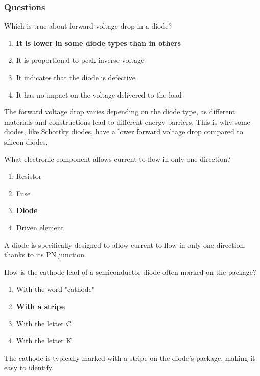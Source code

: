 \subsubsection*{Questions}

\begin{tcolorbox}[colback=gray!10!white,colframe=black!75!black,title={T6B01}]
    Which is true about forward voltage drop in a diode?
    \begin{enumerate}[label=\Alph*),noitemsep]
        \item \textbf{It is lower in some diode types than in others}
        \item It is proportional to peak inverse voltage
        \item It indicates that the diode is defective
        \item It has no impact on the voltage delivered to the load
    \end{enumerate}
\end{tcolorbox}
The forward voltage drop varies depending on the diode type, as different materials and constructions lead to different energy barriers. This is why some diodes, like Schottky diodes, have a lower forward voltage drop compared to silicon diodes.

\begin{tcolorbox}[colback=gray!10!white,colframe=black!75!black,title={T6B02}]
    What electronic component allows current to flow in only one direction?
    \begin{enumerate}[label=\Alph*),noitemsep]
        \item Resistor
        \item Fuse
        \item \textbf{Diode}
        \item Driven element
    \end{enumerate}
\end{tcolorbox}
A diode is specifically designed to allow current to flow in only one direction, thanks to its PN junction.

\begin{tcolorbox}[colback=gray!10!white,colframe=black!75!black,title={T6B06}]
    How is the cathode lead of a semiconductor diode often marked on the package?
    \begin{enumerate}[label=\Alph*),noitemsep]
        \item With the word "cathode"
        \item \textbf{With a stripe}
        \item With the letter C
        \item With the letter K
    \end{enumerate}
\end{tcolorbox}
The cathode is typically marked with a stripe on the diode's package, making it easy to identify.

